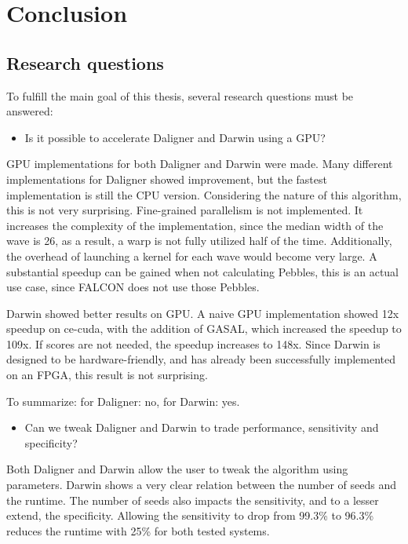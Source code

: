 \documentclass[../thesis.tex]{subfiles}
\begin{document}
\chapter{Conclusion}
\ifdefined\main
\else

\fi


% 

\section{Research questions}
To fulfill the main goal of this thesis, several research questions must be answered:

\begin{itemize}
\item Is it possible to accelerate Daligner and Darwin using a GPU?
\end{itemize}
GPU implementations for both Daligner and Darwin were made.
Many different implementations for Daligner showed improvement, but the fastest implementation is still the CPU version.
Considering the nature of this algorithm, this is not very surprising.
Fine-grained parallelism is not implemented.
It increases the complexity of the implementation, since the median width of the wave is 26, as a result, a warp is not fully utilized half of the time.
Additionally, the overhead of launching a kernel for each wave would become very large.
A substantial speedup can be gained when not calculating Pebbles, this is an actual use case, since FALCON does not use those Pebbles.

Darwin showed better results on GPU.
A naive GPU implementation showed 12x speedup on ce-cuda, with the addition of GASAL, which increased the speedup to 109x.
If scores are not needed, the speedup increases to 148x.
Since Darwin is designed to be hardware-friendly, and has already been successfully implemented on an FPGA, this result is not surprising.

To summarize: for Daligner: no, for Darwin: yes.


\begin{itemize}
\item Can we tweak Daligner and Darwin to trade performance, sensitivity and specificity?
\end{itemize}
Both Daligner and Darwin allow the user to tweak the algorithm using parameters.
Darwin shows a very clear relation between the number of seeds and the runtime.
The number of seeds also impacts the sensitivity, and to a lesser extend, the specificity.
Allowing the sensitivity to drop from 99.3\% to 96.3\% reduces the runtime with 25\% for both tested systems.
\end{document}
